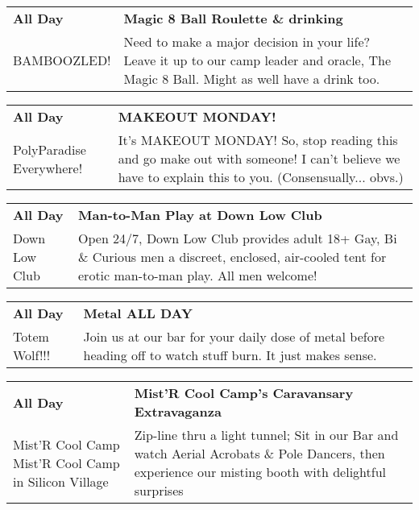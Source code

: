 \begin{tabular}{ p{1in} p{2.2in} }
    \textbf{All Day} & \textbf{Magic 8 Ball Roulette \& drinking} \\
    BAMBOOZLED! \newline  & Need to make a major decision in your life? Leave it up to our camp leader and oracle, The Magic 8 Ball. Might as well have a drink too. \\
    \hline 
\end{tabular}
    
\begin{tabular}{ p{1in} p{2.2in} }
    \textbf{All Day} & \textbf{MAKEOUT MONDAY!} \\
    PolyParadise \newline Everywhere! & It's MAKEOUT MONDAY! So, stop reading this and go make out with someone! I can't believe we have to explain this to you. (Consensually... obvs.) \\
    \hline 
\end{tabular}
    
\begin{tabular}{ p{1in} p{2.2in} }
    \textbf{All Day} & \textbf{Man-to-Man Play at Down Low Club} \\
    Down Low Club \newline  & Open 24/7, Down Low Club provides adult 18+ Gay, Bi \& Curious men a discreet, enclosed, air-cooled tent for erotic man-to-man play. All men welcome! \\
    \hline 
\end{tabular}
    
\begin{tabular}{ p{1in} p{2.2in} }
    \textbf{All Day} & \textbf{Metal ALL DAY } \\
    Totem Wolf!!! \newline  & Join us at our bar for your daily dose of metal before heading off to watch stuff burn. It just makes sense. \\
    \hline 
\end{tabular}
    
\begin{tabular}{ p{1in} p{2.2in} }
    \textbf{All Day} & \textbf{Mist'R Cool Camp's Caravansary Extravaganza} \\
    Mist'R Cool Camp \newline Mist'R Cool Camp in Silicon Village & Zip-line thru a light tunnel; Sit in our Bar and watch Aerial Acrobats \& Pole Dancers, then experience our misting booth with delightful surprises \\
    \hline 
\end{tabular}
    
